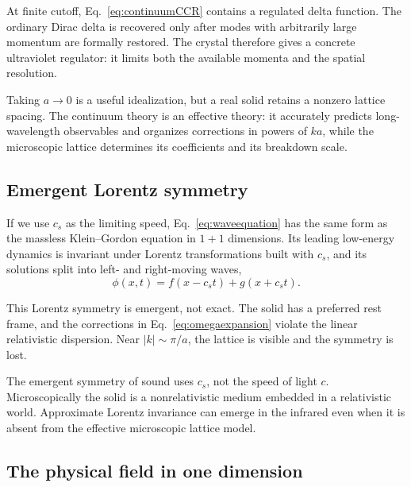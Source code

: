 \documentclass[11pt]{article}
\begin{document}
At finite cutoff, Eq.~\eqref{eq:continuumCCR} contains a regulated delta
function.  The ordinary Dirac delta is recovered only after modes with
arbitrarily large momentum are formally restored.  The crystal therefore
gives a concrete ultraviolet regulator: it limits both the available momenta
and the spatial resolution.

\begin{remarkbox}
Taking $a\to0$ is a useful idealization, but a real solid retains a nonzero
lattice spacing.  The continuum theory is an effective theory: it accurately
predicts long-wavelength observables and organizes corrections in powers of
$ka$, while the microscopic lattice determines its coefficients and its
breakdown scale.
\end{remarkbox}

\subsection{Emergent Lorentz symmetry}

If we use $c_s$ as the limiting speed, Eq.~\eqref{eq:waveequation} has the
same form as the massless Klein--Gordon equation in $1+1$ dimensions.  Its
leading low-energy dynamics is invariant under Lorentz transformations built
with $c_s$, and its solutions split into left- and right-moving waves,
\begin{equation}
  \phi(x,t)=f(x-c_st)+g(x+c_st).
\end{equation}

This Lorentz symmetry is emergent, not exact.  The solid has a preferred rest
frame, and the corrections in Eq.~\eqref{eq:omegaexpansion} violate the
linear relativistic dispersion.  Near $|k|\sim\pi/a$, the lattice is visible
and the symmetry is lost.

\begin{warningbox}
The emergent symmetry of sound uses $c_s$, not the speed of light $c$.
Microscopically the solid is a nonrelativistic medium embedded in a
relativistic world.  Approximate Lorentz invariance can emerge in the
infrared even when it is absent from the effective microscopic lattice
model.
\end{warningbox}

\subsection{The physical field in one dimension}
\end{document}
